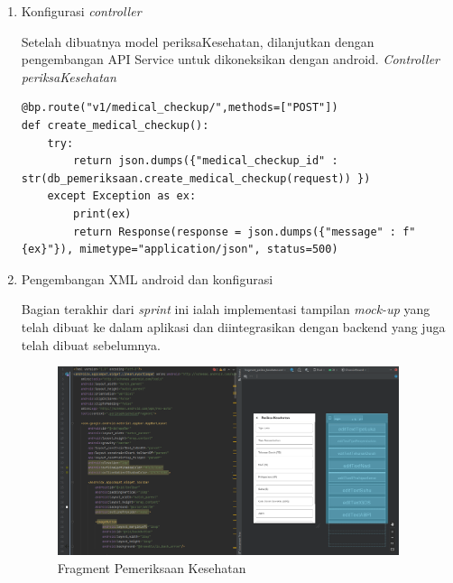 \begin{enumerate}
	\item Konfigurasi \textit{controller}
	
	Setelah dibuatnya model periksaKesehatan, dilanjutkan dengan pengembangan API Service untuk dikoneksikan dengan android.
	\textit{Controller periksaKesehatan}
	\begin{lstlisting}
@bp.route("v1/medical_checkup/",methods=["POST"])
def create_medical_checkup():
    try:
        return json.dumps({"medical_checkup_id" : str(db_pemeriksaan.create_medical_checkup(request)) })
    except Exception as ex:
        print(ex)
        return Response(response = json.dumps({"message" : f"{ex}"}), mimetype="application/json", status=500)
	\end{lstlisting}
	
	\item Pengembangan XML android dan konfigurasi
	
	Bagian terakhir dari \textit{sprint} ini ialah implementasi tampilan \textit{mock-up} yang telah dibuat ke dalam aplikasi dan diintegrasikan dengan backend yang juga telah dibuat sebelumnya.
	\begin{figure}[H]
		\centering
		\includegraphics[keepaspectratio, width=10cm]{gambar/fragment_periksa_kesehatan}
		\caption{Fragment Pemeriksaan Kesehatan}
		\label{gambar:fragment_periksa_kesehatan}
	\end{figure}
	

\end{enumerate}

